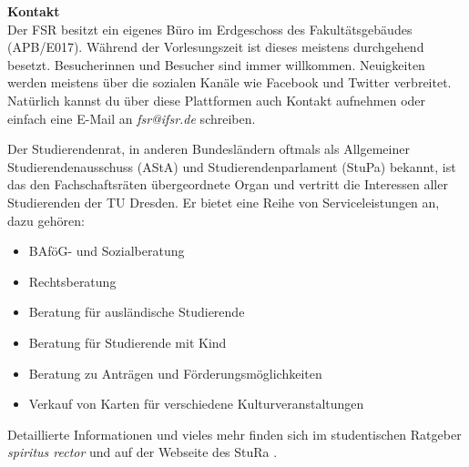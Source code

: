 \textbf{Kontakt} \\
Der FSR besitzt ein eigenes Büro im Erdgeschoss des Fakultätsgebäudes (APB/E017). Während der Vorlesungszeit ist dieses meistens durchgehend besetzt. Besucherinnen und Besucher sind immer willkommen. Neuigkeiten werden meistens über die sozialen Kanäle wie Facebook  und Twitter  verbreitet. Natürlich kannst du über diese Plattformen auch Kontakt aufnehmen oder einfach eine E-Mail an \textit{fsr@ifsr.de} schreiben.

Der Studierendenrat, in anderen Bundesländern oftmals als Allgemeiner Studierendenausschuss (AStA) und Studierendenparlament (StuPa) bekannt, ist das den Fachschaftsräten übergeordnete Organ und vertritt die Interessen aller Studierenden der TU Dresden. Er bietet eine Reihe von Serviceleistungen an, dazu gehören:
\begin{itemize}
\item BAföG- und Sozialberatung
\item Rechtsberatung
\item Beratung für ausländische Studierende
\item Beratung für Studierende mit Kind
\item Beratung zu Anträgen und Förderungsmöglichkeiten
\item Verkauf von Karten für verschiedene Kulturveranstaltungen
\end{itemize}

Detaillierte Informationen und vieles mehr finden sich im studentischen Ratgeber \textit{spiritus rector}  und auf der Webseite des StuRa .


